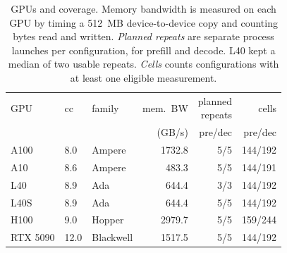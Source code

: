 \documentclass[11pt]{article}
\begin{document}
\begin{table}[tb]
\centering
\small
\setlength{\tabcolsep}{3.2pt}
\begin{tabular}{lllrrr}
\toprule
GPU & cc & family & mem.\ BW & \shortstack{planned\\repeats} & cells \\
 & & & (GB/s) & pre/dec & pre/dec \\
\midrule
A100     & 8.0  & Ampere    & 1732.8 & 5/5 & 144/192 \\
A10      & 8.6  & Ampere    &  483.3 & 5/5 & 144/191 \\
L40      & 8.9  & Ada       &  644.4 & 3/3 & 144/192 \\
L40S     & 8.9  & Ada       &  644.4 & 5/5 & 144/192 \\
H100     & 9.0  & Hopper    & 2979.7 & 5/5 & 159/244 \\
RTX 5090 & 12.0 & Blackwell & 1517.5 & 5/5 & 144/192 \\
\bottomrule
\end{tabular}
\caption{GPUs and coverage. Memory bandwidth is measured on each GPU by timing a
512~MB device-to-device copy and counting bytes read and written.
\emph{Planned repeats} are separate process launches per configuration, for
prefill and decode. L40 kept a median of two usable repeats. \emph{Cells} counts
configurations with at least one eligible measurement.}
\label{tab:devices}
\end{table}
\end{document}

